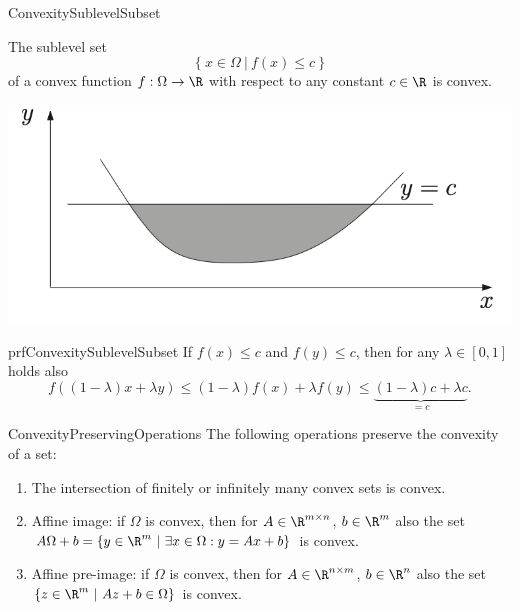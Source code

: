 \begin{theo}{ConvexitySublevelSubset}
    \vspace*{-0.5cm}
    \begin{minipage}{0.58\textwidth}
        The sublevel set 
        \begin{equation*}
            \{ \ x \in \Omega \ | \ f(x) \leq c \ \}
        \end{equation*} 
        of a convex function $f: \Omega \rightarrow \R$ with respect to any constant $c \in \R$ is convex. 
    \end{minipage}
    \begin{minipage}{0.38\textwidth}
        \begin{center}
            \vspace*{0.5cm}
            \includegraphics[scale = 0.475]{Images/Fundamental/ConvexSubset.png}
        \end{center}
    \end{minipage}
    \vspace{-0.3cm}
\end{theo}

\begin{prf}{prfConvexitySublevelSubset}
    If $f(x) \leq c$ and $f(y) \leq c$, then for any $\lambda \in [0,1]$ holds also 
    \begin{equation*}
        f((1-\lambda)x + \lambda y) \leq (1-\lambda)f(x) + \lambda f(y) \leq \underset{= c}{\underbrace{(1-\lambda)c + \lambda c}}.
    \end{equation*}
    \vspace*{-0.7cm}
\end{prf}

\begin{pro}{ConvexityPreservingOperations}
    The following operations preserve the convexity of a set:
    \begin{enumerate}
        \item The intersection of finitely or infinitely many convex sets is convex.
        \item Affine image: if $\Omega$ is convex, then for $A \in \R^{m \times n}$, $b \in \R^m$ also the set $A\Omega + b = \{ y \in \R^m \ | \ \exists x \in \Omega : y = Ax + b \}$ is convex.
        \item Affine pre-image: if $\Omega$ is convex, then for $A \in \R^{n \times m}$, $b \in \R^n$ also the set $\{ z \in \R^m \ | \ Az + b \in \Omega \}$ is convex.
    \end{enumerate}
\end{pro}

